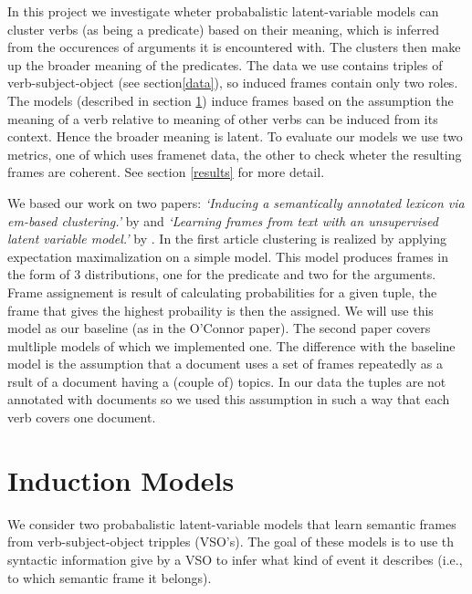 \documentclass[11pt,twocolumn,DIV=11]{scrartcl}
\begin{document}
In this project we investigate wheter probabalistic latent-variable models can cluster verbs (as being a predicate) based on their meaning, which is inferred from the occurences of arguments it is encountered with. The clusters then make up the broader meaning of the predicates. The data we use contains triples of verb-subject-object (see section\ref{data}), so induced frames contain only two roles. The models (described in section \ref{models}) induce frames based on the assumption the meaning of a verb relative to meaning of other verbs can be induced from its context. Hence the broader meaning is latent. To evaluate our models we use two metrics, one of which uses framenet data, the other to check wheter the resulting frames are coherent. See section \ref{results} for more detail.

We based our work on two papers: \textit{`Inducing a semantically annotated lexicon via em-based clustering.'} by \citeauthor{rooth1999} and \textit{`Learning frames from text with an unsupervised latent variable model.'} by \citeauthor{oconnor2013}. In the first article clustering is realized by applying expectation maximalization on a simple model. This model produces frames in the form of 3 distributions, one for the predicate and two for the arguments. Frame assignement is result of calculating  probabilities for a given tuple, the frame that gives the highest probaility is then the assigned. We will use this model as our baseline (as in the O'Connor paper). The second paper covers multliple models of which we implemented one. The difference with the baseline model is the assumption that a document uses a set of frames repeatedly as a rsult of a document having a (couple of) topics. In our data the tuples are not annotated with documents so we used this assumption in such a way that each verb covers one document.  


\section{Induction Models}
\label{models}
We consider two probabalistic latent-variable models that learn semantic frames
from verb-subject-object tripples (VSO's).
The goal of these models is to use th syntactic information give by a VSO to
infer what kind of event it describes (i.e., to which semantic frame it belongs).
\end{document}
